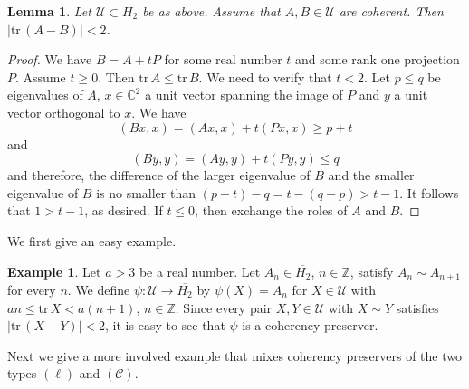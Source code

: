 \documentclass[10pt]{amsart}
\newtheorem{lemma}[theorem]{Lemma}
\theoremstyle{definition}
\newtheorem{example}[theorem]{Example}
\theoremstyle{remark}
\numberwithin{subsection}{section}
\numberwithin{equation}{section}
\newcommand\oH{{\overline{H_2}}}
\begin{document}
\begin{lemma}\label{neksej}
Let  $\mathcal{U}\subset H_2$ be as above.
Assume that $A, B\in \mathcal{U}$ are coherent. Then $|\mathrm{tr}\,(A-B)|<2$. 
\end{lemma}
\begin{proof}
We have $B = A + tP$ for some real number $t$ and some rank one projection $P$. Assume $t \ge 0$.
 Then $\mathrm{tr}\, A \le \mathrm{tr}\, B$. We need to verify that $t < 2$. Let $p \le q$ be eigenvalues of $A$, $x\in \mathbb{C}^2$ a unit vector spanning the image of $P$ and $y$ a unit vector orthogonal to $x$. We have
\[
(Bx,x) = (Ax,x) +t(Px,x) \ge p + t
\]
and
\[
(By,y) = (Ay,y) +t(Py,y) \le q 
\]
and therefore, the difference of the larger eigenvalue of $B$ and the smaller eigenvalue of $B$ is no smaller than $(p+t) - q = t - (q-p) > t -1$. It follows that $1 > t-1$, as desired. 
If $t\leq 0$, then exchange the roles of $A$ and $B$.
\end{proof}

We first give an easy example.
\begin{example}
Let $a > 3$ be a real number.
Let $A_n\in \oH$, $n\in \mathbb{Z}$, satisfy $A_n\sim A_{n+1}$ for every $n$.
We define $\psi\colon \mathcal{U}\to \oH$ by $\psi(X)=A_n$ for $X\in \mathcal{U}$ with $an\leq\mathrm{tr}\, X<a(n+1)$, $n\in \mathbb{Z}$. 
Since every pair $X, Y\in \mathcal{U}$ with $X\sim Y$ satisfies $|\mathrm{tr}\,(X-Y)|<2$, it is easy to see that $\psi$ is a coherency preserver.
\end{example}

Next we give a more involved example that mixes coherency preservers of the two types $(\ell)$ and $(\mathcal{C})$.
\end{document}
